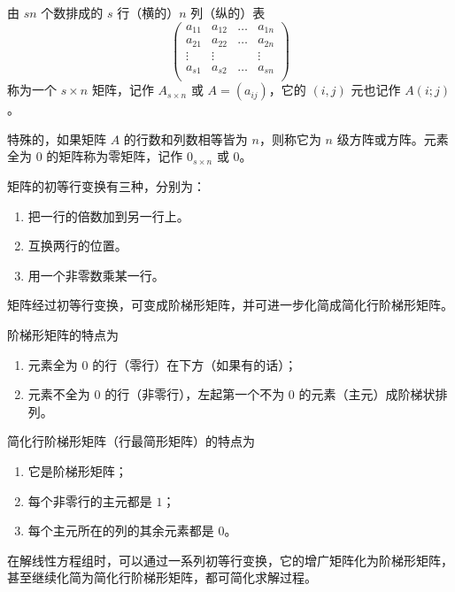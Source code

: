 \begin{definition}
	由 $sn$ 个数排成的 $s$ 行（横的）$n$ 列（纵的）表
	\[ \left(
		\begin{matrix}
				a_{11} & a_{12} & \ldots & a_{1n} \\
				a_{21} & a_{22} & \ldots & a_{2n} \\
				\vdots & \vdots &        & \vdots \\a_{s1}&a_{s2}&\ldots&a_{sn}\\
			\end{matrix}
		\right) \]
	称为一个 $s\times n$ 矩阵，记作 $A_{s\times n}$ 或 $A=(a_{ij})$，它的 $(i,j)$ 元也记作 $A(i;j)$。
\end{definition}

特殊的，如果矩阵 $A$ 的行数和列数相等皆为 $n$，则称它为 $n$ 级方阵或方阵。元素全为 $0$ 的矩阵称为零矩阵，记作 $0_{s\times n}$ 或 $0$。

\begin{definition}[初等行变换]
	矩阵的初等行变换有三种，分别为：

	\begin{enumerate}
		\item 把一行的倍数加到另一行上。
		\item 互换两行的位置。
		\item 用一个非零数乘某一行。
	\end{enumerate}
\end{definition}

矩阵经过初等行变换，可变成阶梯形矩阵，并可进一步化简成简化行阶梯形矩阵。

阶梯形矩阵的特点为

\begin{enumerate}
	\item 元素全为 $0$ 的行（零行）在下方（如果有的话）；
	\item 元素不全为 $0$ 的行（非零行），左起第一个不为 $0$ 的元素（主元）成阶梯状排列。
\end{enumerate}

简化行阶梯形矩阵（行最简形矩阵）的特点为

\begin{enumerate}
	\item 它是阶梯形矩阵；
	\item 每个非零行的主元都是 $1$；
	\item 每个主元所在的列的其余元素都是 $0$。
\end{enumerate}

在解线性方程组时，可以通过一系列初等行变换，它的增广矩阵化为阶梯形矩阵，甚至继续化简为简化行阶梯形矩阵，都可简化求解过程。

